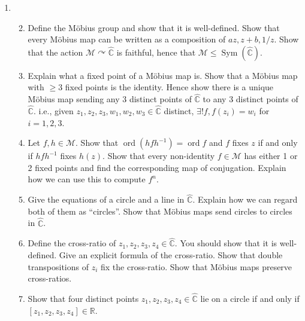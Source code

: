 \documentclass[11pt]{article}
\newcommand{\mobius}{{M\"{o}bius }}
\newcommand{\mcM}{\mathcal{M}}
\newcommand{\bbC}{\mathbb{C}}
\newcommand{\bbR}{\mathbb{R}}
\newlength{\qspace}
\newcounter{qnumber}
\newenvironment{question}%
 {\vspace{\qspace}
  \begin{enumerate}[\bfseries 1\quad][10]%
    \setcounter{enumi}{\value{qnumber}}%
    \item%
 }
{
  \end{enumerate}
  \filbreak
  \stepcounter{qnumber}
 }
\newenvironment{questionparts}[1][1]%
 {
  \begin{enumerate}[\bfseries (i)]%
    \setcounter{enumii}{#1}
    \addtocounter{enumii}{-1}
    \setlength{\parskip}{3pt}
 }
 {
  \end{enumerate}
 }
\DeclareMathOperator{\ord}{ord}
\DeclareMathOperator{\sym}{Sym}
\def\le{\leqslant}
\def\ge{\geqslant}
\begin{document}
\begin{question}
  \begin{questionparts}
    \item  Define the \mobius group and show that it is well-defined. Show that every \mobius map can be written as a composition of $ az, z+b,1/z $. Show that the action $ \mcM \curvearrowright \hat{\mathbb{C}} $ is faithful, hence that $ \mathcal{M}\le \sym(\hat{\bbC}) $.
    \item Explain what a fixed point of a \mobius map is. Show that a \mobius map with $\ge 3$ fixed points is the identity. Hence show there is a unique \mobius map sending any 3 distinct points of $ \hat{\mathbb{C}} $ to any 3 distinct points of $ \hat{\bbC} $. i.e., given $ z_1,z_2,z_3, w_1,w_2,w_3\in \hat{\bbC} $ distinct, $ \exists ! f, f(z_i)=w_i $ for $i=1,2,3$.
    \item Let $ f,h\in \mcM $. Show that $ \ord(hfh^{-1})=\ord f $ and $ f $ fixes $z$ if and only if $ hfh^{-1} $ fixes $ h(z) $. Show that every non-identity $f\in \mcM$ has either 1 or 2 fixed points and find the corresponding map of conjugation. Explain how we can use this to compute $ f^n $.
    \item Give the equations of a circle and a line in $ \hat{\bbC} $. Explain how we can regard both of them as ``circles''. Show that \mobius maps send circles to circles in $ \hat{\bbC} $.
    \item Define the cross-ratio of $ z_1,z_2,z_3,z_4\in \hat{\bbC} $. You should show that it is well-defined. Give an explicit formula of the cross-ratio. Show that double transpositions of $z_i$ fix the cross-ratio. Show that \mobius maps preserve cross-ratios.
    \item Show that four distinct points $z_1,z_2,z_3,z_4\in \hat{\bbC}$ lie on a circle if and only if $[z_1,z_2,z_3,z_4]\in \bbR$.
  \end{questionparts}
\end{question}
\end{document}
